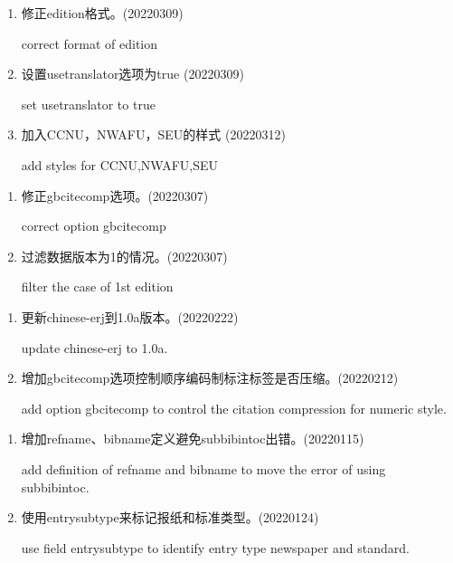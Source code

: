 \label{up:20220313}
\begin{enumerate}

\item 修正edition格式。(20220309)

correct format of edition

\item 设置usetranslator选项为true (20220309)

set usetranslator to true

\item 加入CCNU，NWAFU，SEU的样式 (20220312)

add styles for CCNU,NWAFU,SEU

\end{enumerate}



\label{up:20220307}
\begin{enumerate}

\item 修正gbcitecomp选项。(20220307)

correct option gbcitecomp

\item 过滤数据版本为1的情况。(20220307)

filter the case of 1st edition

\end{enumerate}


\label{up:20220222}
\begin{enumerate}

\item 更新chinese-erj到1.0a版本。(20220222)

update chinese-erj to 1.0a.

\item 增加gbcitecomp选项控制顺序编码制标注标签是否压缩。(20220212)

add option gbcitecomp to control the citation compression for numeric style.

\end{enumerate}



\label{up:20220124}
\begin{enumerate}

\item 增加refname、bibname定义避免subbibintoc出错。(20220115)

add definition of refname and bibname to move the error of using subbibintoc.

\item 使用entrysubtype来标记报纸和标准类型。(20220124)

use field entrysubtype to identify entry type newspaper and standard.

\end{enumerate}


